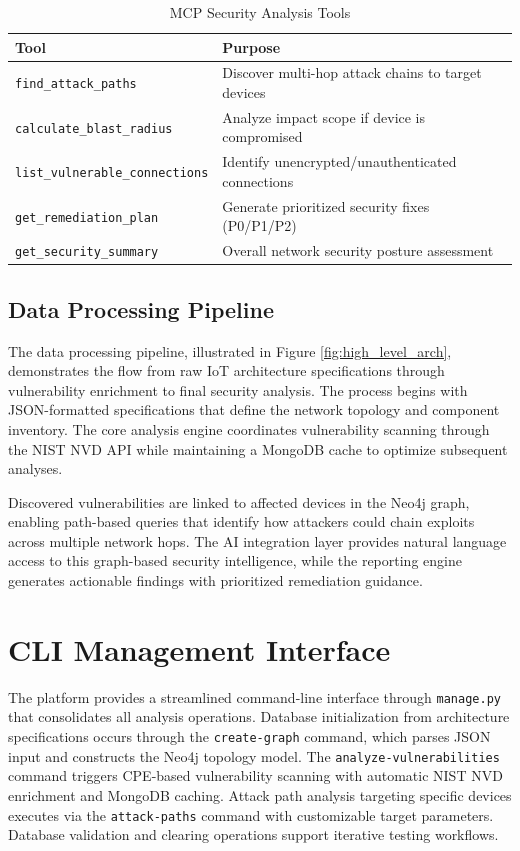 \documentclass[11pt,a4paper]{article}
\begin{document}
\begin{table}[H]
\centering
\begin{tabular}{|l|p{9cm}|}
\hline
\textbf{Tool} & \textbf{Purpose} \\
\hline
\texttt{find\_attack\_paths} & Discover multi-hop attack chains to target devices \\
\texttt{calculate\_blast\_radius} & Analyze impact scope if device is compromised \\
\texttt{list\_vulnerable\_connections} & Identify unencrypted/unauthenticated connections \\
\texttt{get\_remediation\_plan} & Generate prioritized security fixes (P0/P1/P2) \\
\texttt{get\_security\_summary} & Overall network security posture assessment \\
\hline
\end{tabular}
\caption{MCP Security Analysis Tools}
\label{tab:mcp_tools}
\end{table}

\subsection{Data Processing Pipeline}

The data processing pipeline, illustrated in Figure \ref{fig:high_level_arch}, demonstrates the flow from raw IoT architecture specifications through vulnerability enrichment to final security analysis. The process begins with JSON-formatted specifications that define the network topology and component inventory. The core analysis engine coordinates vulnerability scanning through the NIST NVD API while maintaining a MongoDB cache to optimize subsequent analyses. 

Discovered vulnerabilities are linked to affected devices in the Neo4j graph, enabling path-based queries that identify how attackers could chain exploits across multiple network hops. The AI integration layer provides natural language access to this graph-based security intelligence, while the reporting engine generates actionable findings with prioritized remediation guidance.

\section{CLI Management Interface}

The platform provides a streamlined command-line interface through \texttt{manage.py} that consolidates all analysis operations. Database initialization from architecture specifications occurs through the \texttt{create-graph} command, which parses JSON input and constructs the Neo4j topology model. The \texttt{analyze-vulnerabilities} command triggers CPE-based vulnerability scanning with automatic NIST NVD enrichment and MongoDB caching. Attack path analysis targeting specific devices executes via the \texttt{attack-paths} command with customizable target parameters. Database validation and clearing operations support iterative testing workflows.
\end{document}
